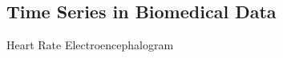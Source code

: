 \documentclass[../main.tex]{subfiles}
\begin{document}
    \subsection{Time Series in Biomedical Data}
        Heart Rate
        Electroencephalogram
        
\end{document}
